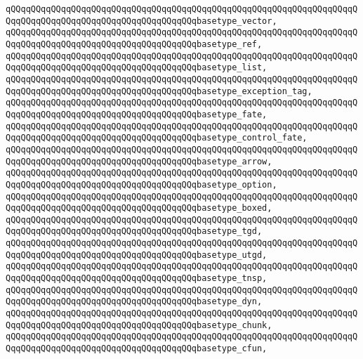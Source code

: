 \verb|qQQqqQQqqQQqqQQqqQQqqQQqqQQqqQQqqQQqqQQqqQQqqQQqqQQqqQQqqQQqqQQqqQQqqQQqqQQqqQQqqQQqqQQqqQQqqQQqqQQqqQQqqQQqbasetype_vector,|\newline
\verb|qQQqqQQqqQQqqQQqqQQqqQQqqQQqqQQqqQQqqQQqqQQqqQQqqQQqqQQqqQQqqQQqqQQqqQQqqQQqqQQqqQQqqQQqqQQqqQQqqQQqqQQqqQQqbasetype_ref,|\newline
\verb|qQQqqQQqqQQqqQQqqQQqqQQqqQQqqQQqqQQqqQQqqQQqqQQqqQQqqQQqqQQqqQQqqQQqqQQqqQQqqQQqqQQqqQQqqQQqqQQqqQQqqQQqqQQqbasetype_list,|\newline
\verb|qQQqqQQqqQQqqQQqqQQqqQQqqQQqqQQqqQQqqQQqqQQqqQQqqQQqqQQqqQQqqQQqqQQqqQQqqQQqqQQqqQQqqQQqqQQqqQQqqQQqqQQqqQQqbasetype_exception_tag,|\newline
\verb|qQQqqQQqqQQqqQQqqQQqqQQqqQQqqQQqqQQqqQQqqQQqqQQqqQQqqQQqqQQqqQQqqQQqqQQqqQQqqQQqqQQqqQQqqQQqqQQqqQQqqQQqqQQqbasetype_fate,|\newline
\verb|qQQqqQQqqQQqqQQqqQQqqQQqqQQqqQQqqQQqqQQqqQQqqQQqqQQqqQQqqQQqqQQqqQQqqQQqqQQqqQQqqQQqqQQqqQQqqQQqqQQqqQQqqQQqbasetype_control_fate,|\newline
\verb|qQQqqQQqqQQqqQQqqQQqqQQqqQQqqQQqqQQqqQQqqQQqqQQqqQQqqQQqqQQqqQQqqQQqqQQqqQQqqQQqqQQqqQQqqQQqqQQqqQQqqQQqqQQqbasetype_arrow,|\newline
\verb|qQQqqQQqqQQqqQQqqQQqqQQqqQQqqQQqqQQqqQQqqQQqqQQqqQQqqQQqqQQqqQQqqQQqqQQqqQQqqQQqqQQqqQQqqQQqqQQqqQQqqQQqqQQqbasetype_option,|\newline
\verb|qQQqqQQqqQQqqQQqqQQqqQQqqQQqqQQqqQQqqQQqqQQqqQQqqQQqqQQqqQQqqQQqqQQqqQQqqQQqqQQqqQQqqQQqqQQqqQQqqQQqqQQqqQQqbasetype_boxed,|\newline
\verb|qQQqqQQqqQQqqQQqqQQqqQQqqQQqqQQqqQQqqQQqqQQqqQQqqQQqqQQqqQQqqQQqqQQqqQQqqQQqqQQqqQQqqQQqqQQqqQQqqQQqqQQqqQQqbasetype_tgd,|\newline
\verb|qQQqqQQqqQQqqQQqqQQqqQQqqQQqqQQqqQQqqQQqqQQqqQQqqQQqqQQqqQQqqQQqqQQqqQQqqQQqqQQqqQQqqQQqqQQqqQQqqQQqqQQqqQQqbasetype_utgd,|\newline
\verb|qQQqqQQqqQQqqQQqqQQqqQQqqQQqqQQqqQQqqQQqqQQqqQQqqQQqqQQqqQQqqQQqqQQqqQQqqQQqqQQqqQQqqQQqqQQqqQQqqQQqqQQqqQQqbasetype_tnsp,|\newline
\verb|qQQqqQQqqQQqqQQqqQQqqQQqqQQqqQQqqQQqqQQqqQQqqQQqqQQqqQQqqQQqqQQqqQQqqQQqqQQqqQQqqQQqqQQqqQQqqQQqqQQqqQQqqQQqbasetype_dyn,|\newline
\verb|qQQqqQQqqQQqqQQqqQQqqQQqqQQqqQQqqQQqqQQqqQQqqQQqqQQqqQQqqQQqqQQqqQQqqQQqqQQqqQQqqQQqqQQqqQQqqQQqqQQqqQQqqQQqbasetype_chunk,|\newline
\verb|qQQqqQQqqQQqqQQqqQQqqQQqqQQqqQQqqQQqqQQqqQQqqQQqqQQqqQQqqQQqqQQqqQQqqQQqqQQqqQQqqQQqqQQqqQQqqQQqqQQqqQQqqQQqbasetype_cfun,|\newline
